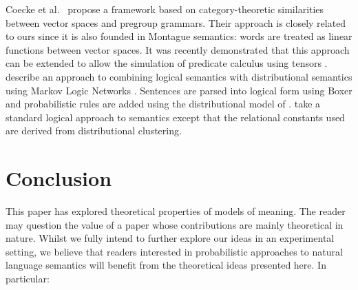 \documentclass[a4paper,11pt]{article}
\renewcommand{\cite}{\citep}
\newcommand{\newcite}[1]{\citet{#1}}
\theoremstyle{definition}
\begin{document}
Coecke et al.~\cite{Coecke:10} propose a framework based on category-theoretic
similarities between vector spaces and pregroup grammars. Their
approach is closely related to ours since it is also
founded in Montague semantics: words are treated as linear functions
between vector spaces. 
%
It was recently
demonstrated that this approach can be extended to allow the
simulation of predicate calculus using
tensors \cite{Grefenstette:13}.
%
\newcite{Garrette:11} describe an approach to combining logical
semantics with distributional semantics using Markov Logic Networks
\cite{Richardson:06}. Sentences are parsed into logical form using
Boxer \cite{Bos:04} and probabilistic rules are added using the
distributional model of \newcite{Erk:10}. \newcite{Lewis:13} take a standard logical approach to
semantics except that the relational constants used are derived from
distributional clustering. 

\section{Conclusion}

This paper has explored theoretical properties of models of meaning. The
reader may question the value of a paper whose contributions
are mainly theoretical in nature. Whilst we fully intend to further explore
our ideas in an experimental setting, we believe that readers
interested in probabilistic approaches to natural language semantics
will benefit from the theoretical ideas presented here. In particular:
\end{document}

